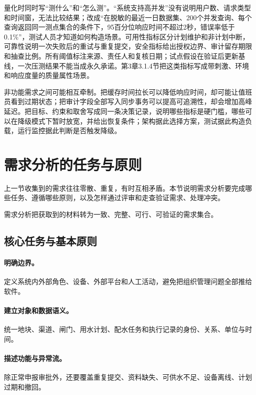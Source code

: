 量化时同时写“测什么”和“怎么测”。“系统支持高并发”没有说明用户数、请求类型和时间窗，无法比较结果；改成“在脱敏的最近一日数据集、200个并发查询、每个查询返回同一测点集合的条件下，95百分位响应时间不超过2秒，错误率低于0.1\%”，测试人员才知道如何构造场景。可用性指标区分计划维护和非计划中断，可靠性说明一次失败后的重试与重复提交，安全指标给出授权边界、审计留存期限和抽查比例。所有阈值标注来源、责任人和复核日期；试点假设在验证后更新基线，一次压测结果不能当成永久承诺。第3章3.1.4节把这类指标写成带刺激、环境和响应度量的质量属性场景。

非功能需求之间可能相互牵制。把缓存时间拉长可以降低响应时间，却可能让值班员看到过期状态；把审计字段全部写入同步事务可以提高可追溯性，却会增加高峰延迟。把目标、约束和取舍写成同一条决策记录，说明哪些指标是硬门槛，哪些可以在降级模式下暂时放宽，并给出恢复条件；架构据此选择方案，测试据此构造负载，运行监控据此判断是否触发降级。

\section{需求分析的任务与原则}

上一节收集到的需求往往零散、重复，有时互相矛盾。本节说明需求分析要完成哪些任务、遵循哪些原则，以及怎样通过评审和走查验证需求、处理冲突。

需求分析把获取到的材料转为一致、完整、可行、可验证的需求集合。

\subsection{核心任务与基本原则}

\paragraph{明确边界。} 定义系统内外部角色、设备、外部平台和人工活动，避免把组织管理问题全部推给软件。

\paragraph{建立对象和数据语义。} 统一地块、渠道、闸门、用水计划、配水任务和执行记录的身份、关系、单位与时间。

\paragraph{描述功能与异常流。} 除正常申报审批外，还要覆盖重复提交、资料缺失、可供水不足、设备离线、计划过期和撤回。

